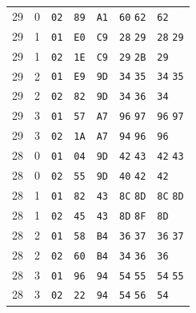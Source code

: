 \begin{longtable}{rrlllll}
29 & 0 & \texttt{02} & \texttt{89} & \texttt{A1} & \texttt{60} \texttt{62} & \texttt{62}\\
29 & 1 & \texttt{01} & \texttt{E0} & \texttt{C9} & \texttt{28} \texttt{29} & \texttt{28} \texttt{29}\\
29 & 1 & \texttt{02} & \texttt{1E} & \texttt{C9} & \texttt{29} \texttt{2B} & \texttt{29}\\
29 & 2 & \texttt{01} & \texttt{E9} & \texttt{9D} & \texttt{34} \texttt{35} & \texttt{34} \texttt{35}\\
29 & 2 & \texttt{02} & \texttt{82} & \texttt{9D} & \texttt{34} \texttt{36} & \texttt{34}\\
29 & 3 & \texttt{01} & \texttt{57} & \texttt{A7} & \texttt{96} \texttt{97} & \texttt{96} \texttt{97}\\
29 & 3 & \texttt{02} & \texttt{1A} & \texttt{A7} & \texttt{94} \texttt{96} & \texttt{96}\\
28 & 0 & \texttt{01} & \texttt{04} & \texttt{9D} & \texttt{42} \texttt{43} & \texttt{42} \texttt{43}\\
28 & 0 & \texttt{02} & \texttt{55} & \texttt{9D} & \texttt{40} \texttt{42} & \texttt{42}\\
28 & 1 & \texttt{01} & \texttt{82} & \texttt{43} & \texttt{8C} \texttt{8D} & \texttt{8C} \texttt{8D}\\
28 & 1 & \texttt{02} & \texttt{45} & \texttt{43} & \texttt{8D} \texttt{8F} & \texttt{8D}\\
28 & 2 & \texttt{01} & \texttt{58} & \texttt{B4} & \texttt{36} \texttt{37} & \texttt{36} \texttt{37}\\
28 & 2 & \texttt{02} & \texttt{60} & \texttt{B4} & \texttt{34} \texttt{36} & \texttt{36}\\
28 & 3 & \texttt{01} & \texttt{96} & \texttt{94} & \texttt{54} \texttt{55} & \texttt{54} \texttt{55}\\
28 & 3 & \texttt{02} & \texttt{22} & \texttt{94} & \texttt{54} \texttt{56} & \texttt{54}\\
\bottomrule
\end{longtable}
\endgroup
